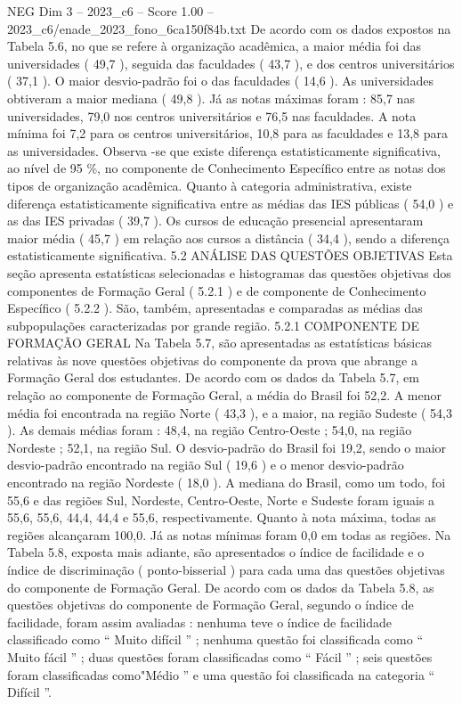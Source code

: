 \begin{textsample}{NEG Dim 3 – 2023\_c6 – Score 1.00 – 2023\_c6/enade\_2023\_fono\_6ca150f84b.txt}
De acordo com os dados expostos na Tabela 5.6, no que se refere à organização acadêmica, a maior média foi das universidades ( 49,7 ), seguida das faculdades ( 43,7 ), e dos centros universitários ( 37,1 ).
O maior desvio-padrão foi o das faculdades ( 14,6 ).
As universidades obtiveram a maior mediana ( 49,8 ).
Já as notas máximas foram : 85,7 nas universidades, 79,0 nos centros universitários e 76,5 nas faculdades.
A nota mínima foi 7,2 para os centros universitários, 10,8 para as faculdades e 13,8 para as universidades.
Observa -se que existe diferença estatisticamente significativa, ao nível de 95 \%, no componente de Conhecimento Específico entre as notas dos tipos de organização acadêmica.
Quanto à categoria administrativa, existe diferença estatisticamente significativa entre as médias das IES públicas ( 54,0 ) e as das IES privadas ( 39,7 ).
Os cursos de educação presencial apresentaram maior média ( 45,7 ) em relação aos cursos a distância ( 34,4 ), sendo a diferença estatisticamente significativa. 5.2 ANÁLISE DAS QUESTÕES OBJETIVAS Esta seção apresenta estatísticas selecionadas e histogramas das questões objetivas dos componentes de Formação Geral ( 5.2.1 ) e de componente de Conhecimento Específico ( 5.2.2 ).
São, também, apresentadas e comparadas as médias das subpopulações caracterizadas por grande região. 5.2.1 COMPONENTE DE FORMAÇÃO GERAL Na Tabela 5.7, são apresentadas as estatísticas básicas relativas às nove questões objetivas do componente da prova que abrange a Formação Geral dos estudantes.
De acordo com os dados da Tabela 5.7, em relação ao componente de Formação Geral, a média do Brasil foi 52,2.
A menor média foi encontrada na região Norte ( 43,3 ), e a maior, na região Sudeste ( 54,3 ).
As demais médias foram : 48,4, na região Centro-Oeste ; 54,0, na região Nordeste ; 52,1, na região Sul.
O desvio-padrão do Brasil foi 19,2, sendo o maior desvio-padrão encontrado na região Sul ( 19,6 ) e o menor desvio-padrão encontrado na região Nordeste ( 18,0 ).
A mediana do Brasil, como um todo, foi 55,6 e das regiões Sul, Nordeste, Centro-Oeste, Norte e Sudeste foram iguais a 55,6, 55,6, 44,4, 44,4 e 55,6, respectivamente.
Quanto à nota máxima, todas as regiões alcançaram 100,0.
Já as notas mínimas foram 0,0 em todas as regiões.
Na Tabela 5.8, exposta mais adiante, são apresentados o índice de facilidade e o índice de discriminação ( ponto-bisserial ) para cada uma das questões objetivas do componente de Formação Geral.
De acordo com os dados da Tabela 5.8, as questões objetivas do componente de Formação Geral, segundo o índice de facilidade, foram assim avaliadas : nenhuma teve o índice de facilidade classificado como “ Muito difícil ” ; nenhuma questão foi classificada como “ Muito fácil ” ; duas questões foram classificadas como “ Fácil ” ; seis questões foram classificadas como"Médio ” e uma questão foi classificada na categoria “ Difícil ”.

\end{textsample}
